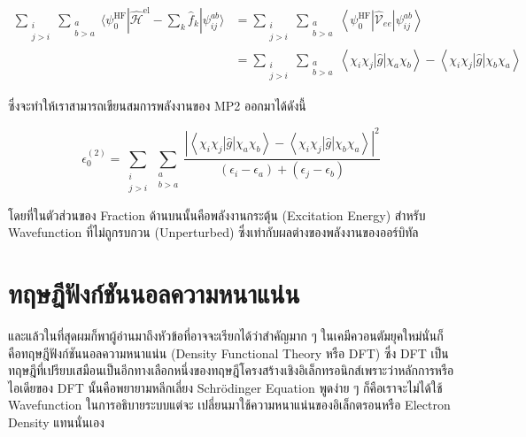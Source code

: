 \begin{equation}
    \begin{aligned}
        \sum_{\substack{i            \\ j>i}} \sum_{\substack{a \\ b>a}}
        \langle
        \psi_{0}^{\mathrm{HF}} | \hat{\mathscr{H}}^{\mathrm{el}}
        - \sum_{k} \hat{f}_{k} | \psi_{i j}^{a b}
        \rangle &
        = \sum_{\substack{i          \\ j>i}} \sum_{\substack{a \\ b>a}}
        \left\langle
        \psi_{0}^{\mathrm{HF}}
        \left|\hat{\mathcal{V}}_{e e}\right|
        \psi_{i j}^{a b}
        \right\rangle                \\
                & =\sum_{\substack{i \\ j>i}} \sum_{\substack{a \\ b>a}}
        \left\langle
        \chi_{i} \chi_{j}|\hat{g}| \chi_{a} \chi_{b}
        \right\rangle
        - \left\langle
        \chi_{i} \chi_{j}|\hat{g}| \chi_{b} \chi_{a}
        \right\rangle
    \end{aligned}
\end{equation}

\noindent ซึ่งจะทำให้เราสามารถเขียนสมการพลังงานของ MP2 ออกมาได้ดังนี้

\begin{equation}
    \epsilon^{(2)}_{0}
    =
    \sum_{\substack{i \\ j>i}} \sum_{\substack{a \\ b>a}}
    \frac
    {
    \left| \left\langle \chi_{i}\chi_{j} | \hat{g} | \chi_{a}\chi_{b} \right\rangle
    - \left\langle \chi_{i}\chi_{j} | \hat{g} | \chi_{b}\chi_{a} \right\rangle \right|^{2}
    }
    {
    (\epsilon_{i} - \epsilon_{a}) + (\epsilon_{j} - \epsilon_{b})
    }
\end{equation}

\noindent โดยที่ในตัวส่วนของ Fraction ด้านบนนั้นคือพลังงานกระตุ้น (Excitation Energy) สำหรับ Wavefunction ที่ไม่ถูกรบกวน
(Unperturbed) ซึ่งเท่ากับผลต่างของพลังงานของออร์บิทัล

\section{ทฤษฎีฟังก์ชันนอลความหนาแน่น}

และแล้วในที่สุดผมก็พาผู้อ่านมาถึงหัวข้อที่อาจจะเรียกได้ว่าสำคัญมาก ๆ ในเคมีควอนตัมยุคใหม่นั่นก็คือทฤษฎีฟังก์ชันนอลความหนาแน่น (Density
Functional Theory หรือ DFT) ซึ่ง DFT เป็นทฤษฎีที่เปรียบเสมือนเป็นอีกทางเลือกหนึ่งของทฤษฎีโครงสร้างเชิงอิเล็กทรอนิกส์เพราะว่าหลักการหรือ%
ไอเดียของ DFT นั้นคือพยายามหลีกเลี่ยง Schr\"{o}dinger Equation พูดง่าย ๆ ก็คือเราจะไม่ได้ใช้ Wavefunction ในการอธิบายระบบแต่จะ%
เปลี่ยนมาใช้ความหนาแน่นของอิเล็กตรอนหรือ Electron Density แทนนั่นเอง

